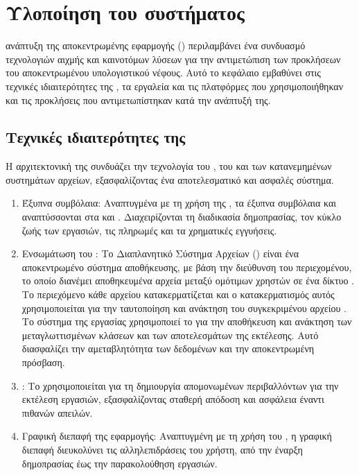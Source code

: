 \chapter{Υλοποίηση του συστήματος}
 ανάπτυξη της αποκεντρωμένης εφαρμογής () περιλαμβάνει ένα συνδυασμό τεχνολογιών αιχμής και καινοτόμων λύσεων για την αντιμετώπιση των προκλήσεων του αποκεντρωμένου υπολογιστικού νέφους. Αυτό το κεφάλαιο εμβαθύνει στις τεχνικές ιδιαιτερότητες της , τα εργαλεία και τις πλατφόρμες που χρησιμοποιήθηκαν και τις προκλήσεις που αντιμετωπίστηκαν κατά την ανάπτυξή της.

\section{Τεχνικές ιδιαιτερότητες της }
Η αρχιτεκτονική της  συνδυάζει την τεχνολογία του , του  και των κατανεμημένων συστημάτων αρχείων, εξασφαλίζοντας ένα αποτελεσματικό και ασφαλές σύστημα.

\begin{enumerate}
    \item Έξυπνα συμβόλαια: Αναπτυγμένα με τη χρήση της , τα έξυπνα συμβόλαια  και  αναπτύσσονται στα   και . Διαχειρίζονται τη διαδικασία δημοπρασίας, τον κύκλο ζωής των εργασιών, τις πληρωμές και τα χρηματικές εγγυήσεις.
    \item Ενσωμάτωση του : Το Διαπλανητικό Σύστημα Αρχείων () είναι ένα αποκεντρωμένο σύστημα αποθήκευσης, με βάση την διεύθυνση του περιεχομένου, το οποίο διανέμει αποθηκευμένα αρχεία μεταξύ ομότιμων χρηστών σε ένα δίκτυο . Το περιεχόμενο κάθε αρχείου κατακερματίζεται και ο κατακερματισμός αυτός  χρησιμοποιείται για την ταυτοποίηση και ανάκτηση του συγκεκριμένου αρχείου \cite{ref42}.
    Το σύστημα της εργασίας χρησιμοποιεί το  για την αποθήκευση και ανάκτηση των μεταγλωττισμένων κλάσεων  και των αποτελεσμάτων της εκτέλεσης. Αυτό διασφαλίζει την αμεταβλητότητα των δεδομένων και την αποκεντρωμένη πρόσβαση.
    \item {}: Το  χρησιμοποιείται για τη δημιουργία απομονωμένων περιβαλλόντων για την εκτέλεση εργασιών, εξασφαλίζοντας σταθερή απόδοση και ασφάλεια έναντι πιθανών απειλών.
    \item Γραφική διεπαφή της εφαρμογής: Αναπτυγμένη με τη χρήση του , η γραφική διεπαφή διευκολύνει τις αλληλεπιδράσεις του χρήστη, από την έναρξη δημοπρασίας έως την παρακολούθηση εργασιών.
\end{enumerate}

